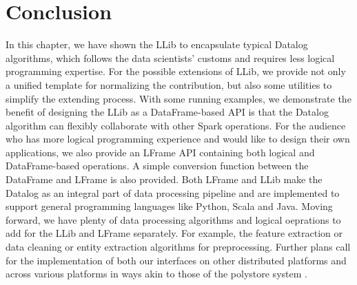 \section{Conclusion}
\label{conclusion}

In this chapter, we have shown the LLib to encapsulate typical Datalog algorithms, which follows the data scientists' customs  and requires less logical programming expertise.  For the possible  extensions of LLib, we provide not only a unified template for normalizing the contribution, but also some utilities to simplify the extending process.  With some running examples, we  demonstrate the benefit of designing the LLib as a DataFrame-based API is that the Datalog algorithm can flexibly collaborate with other Spark operations. For the audience who has more logical programming experience and would like to design their own applications, we also provide an LFrame API containing both logical and DataFrame-based operations. A simple conversion function between the DataFrame and LFrame is also provided. Both LFrame and LLib make the Datalog as an integral part of data processing pipeline and are implemented to support general programming languages like Python, Scala and Java. Moving forward, we have  plenty of data processing algorithms and logical oeprations to add for the LLib and LFrame separately.  For example, the feature extraction \citep{ramirez2017information} or data cleaning  \citep{wang2016cleanix} or entity extraction \citep{wang2019efficient, wang2020boosting}  algorithms for preprocessing.
Further plans call for the implementation of both our  interfaces on other distributed platforms  and 
across various platforms in ways  akin to those  of the  polystore system \citep{duggan2015bigdawg}.
